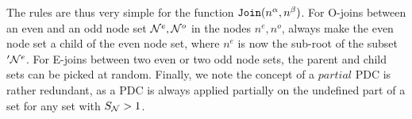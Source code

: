 %
%
%
The rules are thus very simple for the function $\texttt{Join}(n^\alpha, n^\beta)$. For O-joins between an even and an odd node set $\mathcal{N}^e, \mathcal{N}^o$ in the nodes $n^e, n^o$, always make the even node set a child of the even node set, where $n^e$ is now the sub-root of the subset $'\mathcal{N}^e$. For E-joins between two even or two odd node sets, the parent and child sets can be picked at random. Finally, we note the concept of a $partial$ PDC is rather redundant, as a PDC is always applied partially on the undefined part of a set for any set with $S_{\mathcal{N}}>1$.

